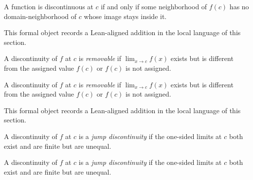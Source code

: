 \begin{remark*}
A function is discontinuous at $c$ if and only if some neighborhood of $f(c)$ has no domain-neighborhood of $c$ whose image stays inside it.
\end{remark*}

\begin{remark*}[Interpretation]
This formal object records a Lean-aligned addition in the local language of this section.
\end{remark*}

\begin{dependencies}
\NoLocalDependencies
\end{dependencies}
\begin{definition}
\label{def:is-removable-discontinuity}
A discontinuity of $f$ at $c$ is \emph{removable} if $\lim_{x\to c}f(x)$ exists but is different from the assigned value $f(c)$ or $f(c)$ is not assigned.
\end{definition}

\begin{remark*}
A discontinuity of $f$ at $c$ is \emph{removable} if $\lim_{x\to c}f(x)$ exists but is different from the assigned value $f(c)$ or $f(c)$ is not assigned.
\end{remark*}

\begin{remark*}[Interpretation]
This formal object records a Lean-aligned addition in the local language of this section.
\end{remark*}

\begin{dependencies}
\NoLocalDependencies
\end{dependencies}
\begin{definition}
\label{def:is-jump-discontinuity}
A discontinuity of $f$ at $c$ is a \emph{jump discontinuity} if the one-sided limits at $c$ both exist and are finite but are unequal.
\end{definition}

\begin{remark*}
A discontinuity of $f$ at $c$ is a \emph{jump discontinuity} if the one-sided limits at $c$ both exist and are finite but are unequal.
\end{remark*}

